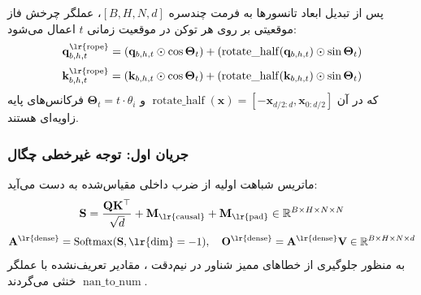 پس از تبدیل ابعاد تانسورها به فرمت چندسره $[B, H, N, d]$، عملگر چرخش فاز موقعیتی  بر روی هر توکن در موقعیت زمانی $t$ اعمال می‌شود:
\begin{equation}
    \mathbf{q}_{b, h, t}^{\text{\lr{rope}}} = (\mathbf{q}_{b, h, t} \odot \cos\mathbf{\Theta}_t) + (\operatorname{rotate\_half}(\mathbf{q}_{b, h, t}) \odot \sin\mathbf{\Theta}_t)
\end{equation}
\begin{equation}
    \mathbf{k}_{b, h, t}^{\text{\lr{rope}}} = (\mathbf{k}_{b, h, t} \odot \cos\mathbf{\Theta}_t) + (\operatorname{rotate\_half}(\mathbf{k}_{b, h, t}) \odot \sin\mathbf{\Theta}_t)
\end{equation}
که در آن $\operatorname{rotate\_half}(\mathbf{x}) = [-\mathbf{x}_{d/2:d}, \mathbf{x}_{0:d/2}]$ و $\mathbf{\Theta}_t = t \cdot \theta_i$ فرکانس‌های پایه زاویه‌ای هستند.

\subsubsection*{جریان اول: توجه غیرخطی چگال }
ماتریس شباهت اولیه از ضرب داخلی مقیاس‌شده به دست می‌آید:
\begin{equation}
    \mathbf{S} = \frac{\mathbf{Q}\mathbf{K}^\top}{\sqrt{d}} + \mathbf{M}_{\text{\lr{causal}}} + \mathbf{M}_{\text{\lr{pad}}} \in \mathbb{R}^{B \times H \times N \times N}
\end{equation}
\begin{equation}
    \mathbf{A}^{\text{\lr{dense}}} = \operatorname{Softmax}(\mathbf{S}, \text{\lr{dim}}=-1), \quad \mathbf{O}^{\text{\lr{dense}}} = \mathbf{A}^{\text{\lr{dense}}} \mathbf{V} \in \mathbb{R}^{B \times H \times N \times d}
\end{equation}
به منظور جلوگیری از خطاهای ممیز شناور در نیم‌دقت ، مقادیر تعریف‌نشده با عملگر $\operatorname{nan\_to\_num}$ خنثی می‌گردند.

